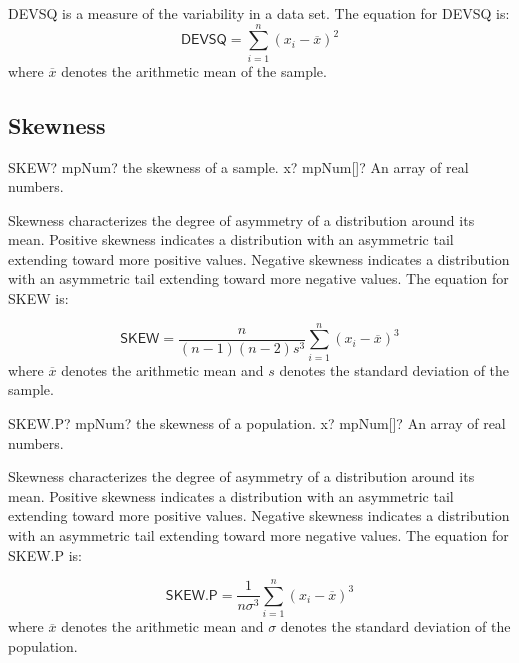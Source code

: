 \textsf{DEVSQ} is a measure of the variability in a data set. The equation for \textsf{DEVSQ} is: 
\begin{equation}
	\textsf{DEVSQ} = \sum_{i=1}^n (x_i-\overline{x})^2
\end{equation}
where $\overline{x}$ denotes the arithmetic mean of the sample.




\subsection{Skewness}

\begin{mpFunctionsExtract}
	\mpWorksheetFunctionOneNotImplemented
	{SKEW? mpNum? the skewness of a sample.}
	{x? mpNum[]? An array of real numbers.}
\end{mpFunctionsExtract}

\vspace{0.3cm}

Skewness characterizes the degree of asymmetry of a distribution around its mean. Positive skewness indicates a distribution with an asymmetric tail extending toward more positive values. Negative skewness indicates a distribution with an asymmetric tail extending toward more negative values. The equation for \textsf{SKEW} is: 

\begin{equation}
	\textsf{SKEW} = \frac{n}{(n-1)(n-2)s^3}\sum_{i=1}^n (x_i-\overline{x})^3 
\end{equation}
where $\overline{x}$ denotes the arithmetic mean and $s$ denotes the standard deviation of the sample.



\vspace{0.6cm}
\begin{mpFunctionsExtract}
	\mpWorksheetFunctionOneNotImplemented
	{SKEW.P? mpNum? the skewness of a population.}
	{x? mpNum[]? An array of real numbers.}
\end{mpFunctionsExtract}

\vspace{0.3cm}

Skewness characterizes the degree of asymmetry of a distribution around its mean. Positive skewness indicates a distribution with an asymmetric tail extending toward more positive values. Negative skewness indicates a distribution with an asymmetric tail extending toward more negative values. The equation for \textsf{SKEW.P} is: 

\begin{equation}
	\textsf{SKEW.P} = \frac{1}{n \sigma^3}\sum_{i=1}^n (x_i-\overline{x})^3 
\end{equation}
where $\overline{x}$ denotes the arithmetic mean and $\sigma$ denotes the standard deviation of the population.



